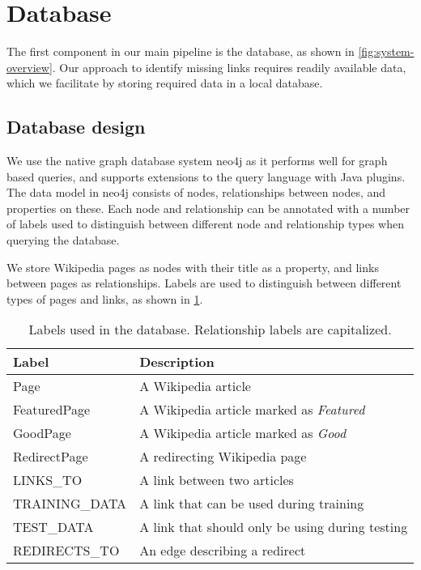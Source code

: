 \section{Database} \label{sec:db}
The first component in our main pipeline is the database, as shown in \cref{fig:system-overview}. Our approach to identify missing links requires readily available data, which we facilitate by storing required data in a local database.

\subsection{Database design} \label{sec:db_design}
We use the native graph database system neo4j as it performs well for graph based queries, and supports extensions to the query language with Java plugins. The data model in neo4j consists of nodes, relationships between nodes, and properties on these. Each node and relationship can be annotated with a number of labels used to distinguish between different node and relationship types when querying the database.

We store Wikipedia pages as nodes with their title as a property, and links between pages as relationships. Labels are used to distinguish between different types of pages and links, as shown in \cref{tab:db_labels}.

\begin{table}[tbp]
\centering
\begin{tabular}{@{}ll@{}}
\toprule
\textbf{Label}         & \textbf{Description}                            \\ \midrule
Page                   & A Wikipedia article                             \\
FeaturedPage           & A Wikipedia article marked as \emph{Featured}   \\
GoodPage               & A Wikipedia article marked as \emph{Good}       \\
RedirectPage           & A redirecting Wikipedia page                    \\ \midrule
LINKS\_TO              & A link between two articles                     \\
TRAINING\_DATA         & A link that can be used during training         \\
TEST\_DATA             & A link that should only be using during testing \\
REDIRECTS\_TO          & An edge describing a redirect                   \\ \bottomrule
\end{tabular}
\caption[Labels used in the database]{Labels used in the database. Relationship labels are capitalized.}
\label{tab:db_labels}
\end{table}

